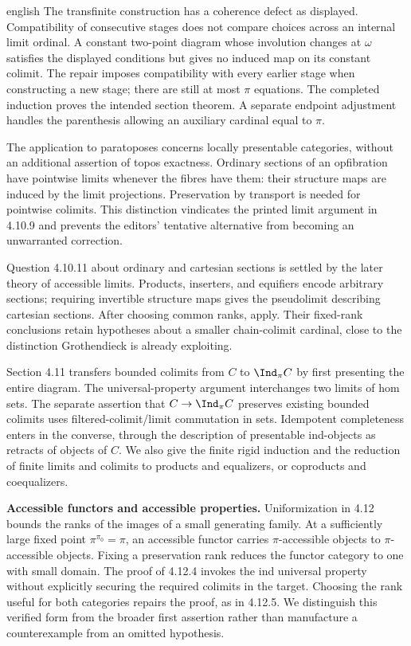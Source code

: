 \begin{otherlanguage*}{english}
The transfinite construction has a coherence defect as displayed. Compatibility of consecutive stages does not compare choices across an internal limit ordinal. A constant two-point diagram whose involution changes at $\omega$ satisfies the displayed conditions but gives no induced map on its constant colimit. The repair imposes compatibility with every earlier stage when constructing a new stage; there are still at most $\pi$ equations. The completed induction proves the intended section theorem. A separate endpoint adjustment handles the parenthesis allowing an auxiliary cardinal equal to $\pi$.

The application to paratoposes concerns locally presentable categories, without an additional assertion of topos exactness. Ordinary sections of an opfibration have pointwise limits whenever the fibres have them: their structure maps are induced by the limit projections. Preservation by transport is needed for pointwise colimits. This distinction vindicates the printed limit argument in 4.10.9 and prevents the editors' tentative alternative from becoming an unwarranted correction.

Question 4.10.11 about ordinary and cartesian sections is settled by the later theory of accessible limits. Products, inserters, and equifiers encode arbitrary sections; requiring invertible structure maps gives the pseudolimit describing cartesian sections. After choosing common ranks, \citet[Theorems 8.1, 8.3 and Corollary 9.2]{Positselski2024Limits} apply. Their fixed-rank conclusions retain hypotheses about a smaller chain-colimit cardinal, close to the distinction Grothendieck is already exploiting.

Section 4.11 transfers bounded colimits from $C$ to $\Ind_\pi C$ by first presenting the entire diagram. The universal-property argument interchanges two limits of hom sets. The separate assertion that $C\to\Ind_\pi C$ preserves existing bounded colimits uses filtered-colimit/limit commutation in sets. Idempotent completeness enters in the converse, through the description of presentable ind-objects as retracts of objects of $C$. We also give the finite rigid induction and the reduction of finite limits and colimits to products and equalizers, or coproducts and coequalizers.

\medskip\noindent\textbf{Accessible functors and accessible properties.}
Uniformization in 4.12 bounds the ranks of the images of a small generating family. At a sufficiently large fixed point $\pi^{\pi_0}=\pi$, an accessible functor carries $\pi$-accessible objects to $\pi$-accessible objects. Fixing a preservation rank reduces the functor category to one with small domain. The proof of 4.12.4 invokes the ind universal property without explicitly securing the required colimits in the target. Choosing the rank useful for both categories repairs the proof, as in 4.12.5. We distinguish this verified form from the broader first assertion rather than manufacture a counterexample from an omitted hypothesis.


\end{otherlanguage*}
